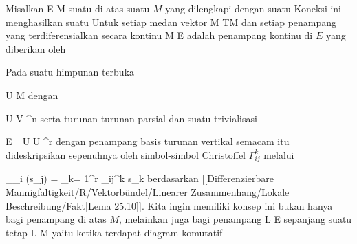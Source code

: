 \setcounter{section}{27}


Misalkan
 { E } { M
} {}
suatu
di atas suatu
$M$ yang dilengkapi dengan suatu
Koneksi ini menghasilkan suatu
Untuk setiap medan vektor
 { M } { TM
} {}
dan setiap penampang yang terdiferensialkan secara kontinu
 { M } { E
} {}
 adalah penampang kontinu di $E$ yang diberikan oleh

 {  }

Pada suatu himpunan terbuka

\mavergleichskette
{\vergleichskette
{ U
}
{ \subseteq }{ M
}
{  }{
}
{    }{
}
{   }{
}
}
{}{}{}
dengan

\mavergleichskette
{\vergleichskette
{ U
}
{ \cong }{ V
}
{ \subseteq }{ \R^n
}
{    }{
}
{   }{
}
}
{}{}{}
serta turunan-turunan parsial
 dan suatu trivialisasi

\mavergleichskettedisp
{\vergleichskette
{ E \vert_U
}
{ \cong} { U \times \R^r
}
{ } {
}
{ } {
}
{ } {
}
}
{}{}{}
dengan penampang basis
 turunan vertikal semacam itu dideskripsikan sepenuhnya oleh simbol-simbol Christoffel $\Gamma_{ij}^k$ melalui

\mavergleichskettedisp
{\vergleichskette
{ \nabla_{\partial_i } (s_j)
}
{ =} { \sum_{k= 1}^r  \Gamma_{ij}^k s_k
}
{ } {
}
{ } {
}
{ } {
}
}
{}{}{}
berdasarkan
[[Differenzierbare Mannigfaltigkeit/R/Vektorbündel/Linearer Zusammenhang/Lokale Beschreibung/Fakt|Lema 25.10]].
Kita ingin memiliki konsep ini bukan hanya bagi penampang di atas $M$, melainkan juga bagi penampang
 { L } { E
} {}
sepanjang suatu
tetap
\maabbdisp {\psi} { L } { M
} {}
yaitu ketika terdapat diagram komutatif

 {  }


